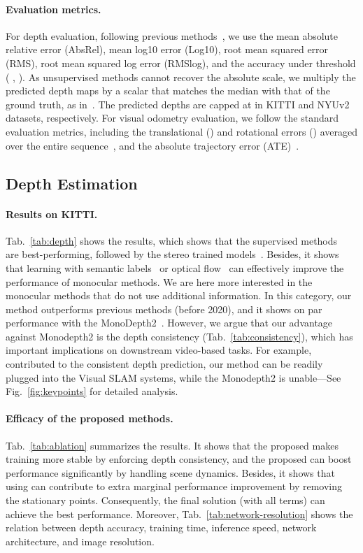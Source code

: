 \documentclass[twocolumn]{svjour3}
\renewcommand{\cite}[1]{\textcolor{blue}{\citep{#1}}}
\newcommand{\figref}[1]{Fig.~\ref{#1}}
\newcommand{\tabref}[1]{Tab.~\ref{#1}}
\begin{document}
\paragraph{Evaluation metrics.}
For depth evaluation, following previous methods~\cite{Yin2019enforcing, zhou2017unsupervised}, we use the mean absolute relative error (AbsRel),
mean log10 error (Log10), root mean squared error (RMS), root mean squared log error (RMSlog), 
and the accuracy under threshold (  , ).
As unsupervised methods cannot recover the absolute scale, we multiply the predicted depth maps by a scalar that matches the median with that of the ground truth,
as in~\cite{zhou2017unsupervised}.
The predicted depths are capped at  in KITTI and NYUv2 datasets, respectively.
For visual odometry evaluation, we follow the standard evaluation metrics,
including the translational () and rotational errors () averaged over the entire sequence~\cite{Geiger2013IJRR},
and the absolute trajectory error (ATE)~\cite{sturm12iros}.


\subsection{Depth Estimation}

\paragraph{Results on KITTI.}
\tabref{tab:depth} shows the results,
which shows that the supervised methods~\cite{fu2018deep, Yin2019enforcing} are best-performing,
followed by the stereo trained models~\cite{yang2020d3vo}.
Besides, it shows that learning with semantic labels~\cite{packnet-semguided} or optical flow~\cite{zhao2020towards} can effectively improve the performance of monocular methods.
We are here more interested in the monocular methods that do not use additional information.
In this category, our method outperforms previous methods (before 2020),
and it shows on par performance with the MonoDepth2~\cite{monodepth2}.
However, we argue that our advantage against Monodepth2 is the depth consistency (\tabref{tab:consistency}),
which has important implications on downstream video-based tasks.
For example, contributed to the consistent depth prediction, our method can be readily plugged into the Visual SLAM systems,
while the Monodepth2 is unable---See \figref{fig:keypoints} for detailed analysis.

\paragraph{Efficacy of the proposed methods.}
\tabref{tab:ablation} summarizes the results.
It shows that the proposed  makes training more stable by enforcing depth consistency,
and the proposed  can boost performance significantly by handling scene dynamics.
Besides, it shows that using  can contribute to extra marginal performance improvement by removing the stationary points.
Consequently, the final solution (with all terms) can achieve the best performance.
Moreover, \tabref{tab:network-resolution} shows the relation between depth accuracy, training time, inference speed, network architecture, and image resolution.
\end{document}
